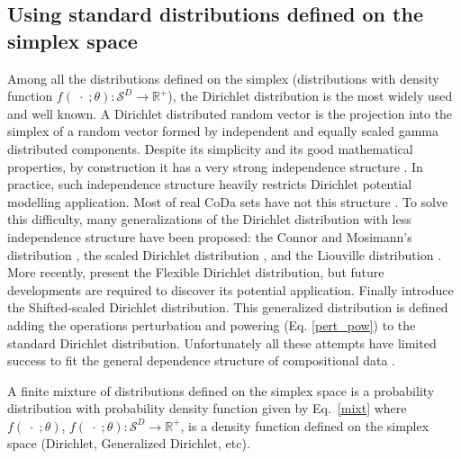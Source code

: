 \documentclass[10pt, a4paper]{article}
\begin{document}
\subsection{Using standard distributions defined on the simplex space}
\label{simplex_section}

\noindent Among all the distributions defined on the simplex (distributions with density function $f(\;\cdot\;;\theta): \mathcal{S}^D\rightarrow \mathbb{R}^+$), the Dirichlet distribution is the most widely used and well known. 
A Dirichlet distributed random vector is the projection into the simplex of a random vector formed by independent and equally scaled gamma distributed components. 
Despite its simplicity and its good mathematical properties, by construction it has a very strong independence structure \citep{aitchison1986statistical}. 
In practice, such independence structure heavily restricts Dirichlet potential modelling application. Most of real CoDa sets have
not this structure \citep{aitchison1986statistical}. To solve this difficulty, many generalizations of the Dirichlet distribution with less
independence structure have been proposed: the Connor and Mosimann's distribution
\citep{Connor:1969}, the scaled Dirichlet distribution \citep{aitchison1986statistical},  and the Liouville distribution \citep{rayens1994dependence}.  More recently, \cite{ongaro2008new} present the Flexible Dirichlet distribution, but future
developments are required to discover its potential application. Finally \cite{monti2011shifted} introduce the Shifted-scaled Dirichlet distribution. This generalized distribution is defined adding the operations
perturbation and powering (Eq. \ref{pert_pow}) to the standard Dirichlet distribution. Unfortunately all these attempts
have limited success to fit the general dependence structure of compositional data \citep{mateu2013normal}.

A finite mixture of distributions defined on the simplex space is a probability distribution with probability density function given by Eq.~\ref{mixt} where $f(\;\cdot\;;\theta)$, $f(\;\cdot\;;\theta): \mathcal{S}^D \rightarrow \mathbb{R}^+$, is a density function defined on the simplex space (Dirichlet, Generalized Dirichlet, etc).
\end{document}
